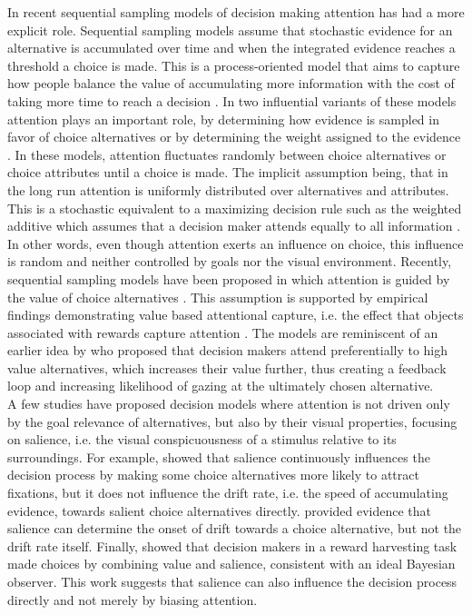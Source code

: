 In recent sequential sampling models of decision making attention has had a more explicit role. Sequential sampling models assume that stochastic evidence for an alternative is accumulated over time and when the integrated evidence reaches a threshold a choice is made. This is a process-oriented model that aims to capture how people balance the value of accumulating more information with the cost of taking more time to reach a decision \citep{forstmann2016}. In two influential variants of these models attention plays an important role, by determining how evidence is sampled in favor of choice alternatives \citep{busemeyer1992} or by determining the weight assigned to the evidence \citep{krajbich2010a, thomas2019}. In these models, attention fluctuates randomly between choice alternatives or choice attributes until a choice is made. The implicit assumption being, that in the long run attention is uniformly distributed over alternatives and attributes. This is a stochastic equivalent to a maximizing decision rule such as the weighted additive which assumes that a decision maker attends equally to all information \cite{gloeckner2011a, payne1988}. In other words, even though attention exerts an influence on choice, this influence is random and neither controlled by goals nor the visual environment. Recently, sequential sampling models have been proposed in which attention is guided by the value of choice alternatives \citep{callaway2019a, gluth2018, gluth2020}. This assumption is supported by empirical findings demonstrating value based attentional capture, i.e. the effect that objects associated with rewards capture attention \citep{lepelley2015}. The models are reminiscent of an earlier idea by \cite{shimojo2003a} who proposed that decision makers attend preferentially to high value alternatives, which increases their value further, thus creating a feedback loop and increasing likelihood of gazing at the ultimately chosen alternative.\\ 

A few studies have proposed decision models where attention is not driven only by the goal relevance of alternatives, but also by their visual properties, focusing on salience, i.e. the visual conspicuousness of a stimulus relative to its surroundings. For example, \cite{towal2013a} showed that salience continuously influences the decision process by making some choice alternatives more likely to attract fixations, but it does not influence the drift rate, i.e. the speed of accumulating evidence, towards salient choice alternatives directly. \cite{chen2013} provided evidence that salience can determine the onset of drift towards a choice alternative, but not the drift rate itself. Finally, \cite{navalpakkam2010} showed that decision makers in a reward harvesting task made choices by combining value and salience, consistent with an ideal Bayesian observer. This work suggests that salience can also influence the decision process directly and not merely by biasing attention.\\ 

